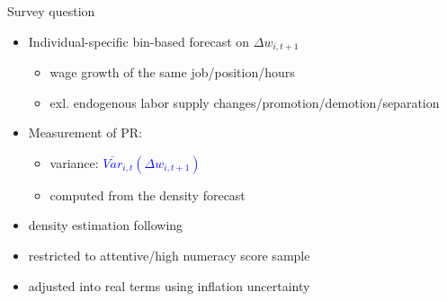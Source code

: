 \documentclass{beamer}
\begin{document}
\begin{frame}{Survey question}
	\begin{itemize}
		\item Individual-specific bin-based forecast on $\Delta w_{i,t+1}$
		\begin{itemize}
			\item wage growth of the same job/position/hours
				\item exl. endogenous labor supply changes/promotion/demotion/separation 
		\end{itemize} 
		\item  Measurement of PR: 
		\begin{itemize}
			\item variance: \textcolor{blue}{$\overline {Var}_{i,t}(\Delta w_{i,t+1})$}  
			\item computed from the density forecast
		\end{itemize}
\item density estimation following \cite{engelberg_comparing_2009}			
\item restricted to attentive/high numeracy score sample
\item adjusted into real terms using inflation uncertainty 
\end{itemize}
\end{frame}
\end{document}
